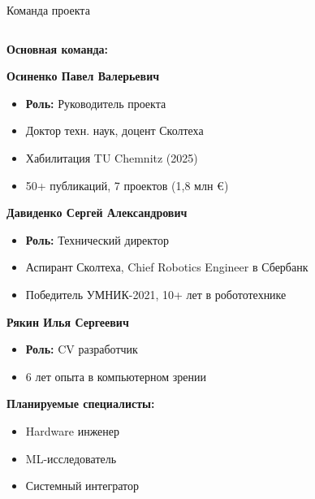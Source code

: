 \begin{frame}[t]{Команда проекта}
    \begin{columns}[T]
        \begin{column}{0.48\textwidth}
            \textbf{\large \textcolor{aiblue}{Основная команда:}}
            \vspace{0.3cm}
            
            \textbf{\textcolor{aigreen}{Осиненко Павел Валерьевич}}
            \begin{itemize}
                \item \textbf{Роль:} Руководитель проекта
                \item Доктор техн. наук, доцент Сколтеха
                \item Хабилитация TU Chemnitz (2025)
                \item 50+ публикаций, 7 проектов (1,8 млн €)
            \end{itemize}
            
            \textbf{\textcolor{aigreen}{Давиденко Сергей Александрович}}
            \begin{itemize}
                \item \textbf{Роль:} Технический директор
                \item Аспирант Сколтеха, Chief Robotics Engineer в Сбербанк
                \item Победитель УМНИК-2021, 10+ лет в робототехнике
            \end{itemize}
            
            \textbf{\textcolor{aigreen}{Рякин Илья Сергеевич}}
            \begin{itemize}
                \item \textbf{Роль:} CV разработчик
                \item 6 лет опыта в компьютерном зрении
            \end{itemize}
            
            \vspace{0.3cm}
            \textbf{\textcolor{aiorange}{Планируемые специалисты:}}
            \begin{itemize}
                \item Hardware инженер
                \item ML-исследователь  
                \item Системный интегратор
            \end{itemize}
        \end{column}
        \hfill
        \begin{column}{0.48\textwidth}
            \centering
            \vspace{0.5cm}
            

\end{column}
\end{columns}
\end{frame}
